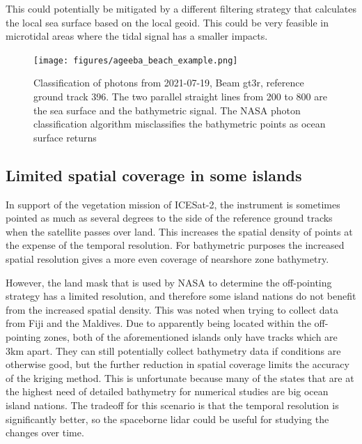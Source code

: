 This could potentially be mitigated by a different filtering strategy that calculates the local sea surface based on the local geoid. This could be very feasible in microtidal areas where the tidal signal has a smaller impacts.

\begin{figure}[htbp]
    \centering
    \texttt{[image: figures/ageeba\_beach\_example.png]}
    \caption{Classification of photons from 2021-07-19, Beam gt3r, reference ground track 396. The two parallel straight lines from 200 to 800 are the sea surface and the bathymetric signal. The NASA photon classification algorithm misclassifies the bathymetric points as ocean surface returns}
    \label{fig:ageeba_bad_classes}
\end{figure}


\subsection{Limited spatial coverage in some islands}

In support of the vegetation mission of ICESat-2, the instrument is sometimes pointed as much as several degrees to the side of the reference ground tracks when the satellite passes over land. This increases the spatial density of points at the expense of the temporal resolution. For bathymetric purposes the increased spatial resolution gives a more even coverage of nearshore zone bathymetry. 

However, the land mask that is used by NASA to determine the off-pointing strategy has a limited resolution, and therefore some island nations do not benefit from the increased spatial density. This was noted when trying to collect data from Fiji and the Maldives. Due to apparently being located within the off-pointing zones, both of the aforementioned islands only have tracks which are 3km apart. They can still potentially collect bathymetry data if conditions are otherwise good, but the further reduction in spatial coverage limits the accuracy of the kriging method. This is unfortunate because many of the states that are at the highest need of detailed bathymetry for numerical studies are big ocean island nations. The tradeoff for this scenario is that the temporal resolution is significantly better, so the spaceborne lidar could be useful for studying the changes over time. 

